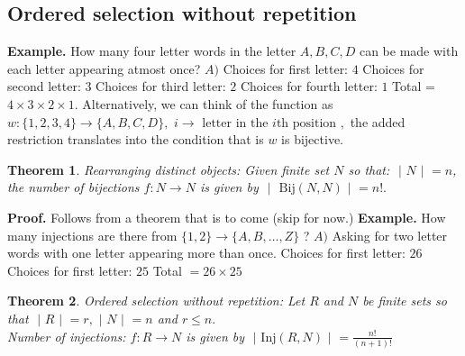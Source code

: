 \documentclass{article}
\newtheorem{theorem}{Theorem}                                       %
\begin{document}
\subsection{Ordered selection without repetition}
\textbf{Example. }
\newline
How many four letter words in the letter $A, B, C, D$ can be made with each letter appearing atmost once?
\newline
\newline
$A) $ Choices for first letter: $4$
\newline 
Choices for second letter: $3$
\newline 
Choices for third letter: $2$
\newline 
Choices for fourth letter: $1$
\newline
Total = $ 4 \times 3 \times 2 \times 1.$
\newline
\newline
Alternatively, we can think of the function as $w: \{ 1, 2, 3, 4\} \rightarrow \{ A, B, C, D\},$
\newline
$i \rightarrow \text{ letter in the } i \text{th position },$ the added restriction translates into the condition that is $w$ is bijective.
\newline
\newline
\begin{theorem}
  Rearranging distinct objects: Given finite set $N$ so that: $\text{ | } N \text{ | } = n$, the number
  of bijections $f: N \rightarrow N$ is given by $\text{ | } \text{ Bij}(N, N) \text{ | } = n!.$
\end{theorem}
\textbf{Proof. } Follows from a theorem that is to come (skip for now.)
\newline
\newline
\textbf{Example. } How many injections are there from $\{ 1, 2\} \rightarrow \{ A, B, \dots, Z\}$ ?
\newline
\newline
$A) $ Asking for two letter words with one letter appearing more than once.
\newline
Choices for first letter: $26$
\newline
Choices for first letter: $25$
\newline
Total $= 26 \times 25$
\newline
\newline
\begin{theorem}
  Ordered selection without repetition: Let $R$ and $N$ be finite sets so that $\text{ | } R \text{ | } = r, \text{ | } N \text{ | } = n$ and $r \leq n.$ 
  \\ 
  Number of injections: $f: R \rightarrow N$ is given by $\text{ | } \text{Inj}(R, N) \text{ | } = \frac{n!}{(n + 1)!}$
\end{theorem}
\end{document}
